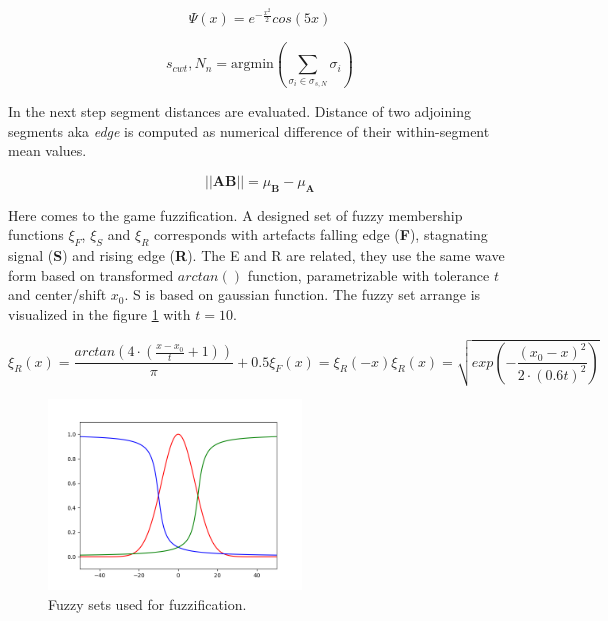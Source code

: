 \begin{equation}
\Psi(x) = e^{-\frac{x^2}{2}} cos(5x)
\label{eq:morlet}
\end{equation}

\begin{equation}
s_{cwt}, N_{n} = \text{argmin} ( \sum_{\sigma_i \in \sigma_{s,N}} \sigma_i )
\label{eq:cwtparamssearch}
\end{equation}

In the next step segment distances are evaluated. Distance of two adjoining segments aka {\it edge} is computed as numerical
difference of their within-segment mean values.

\begin{equation}
||\textbf{AB}|| = \mu_\textbf{B} - \mu_\textbf{A}
\end{equation}

Here comes to the game fuzzification. A designed set of fuzzy membership functions $\xi_F$, $\xi_S$ and $\xi_R$
corresponds with artefacts falling edge (\textbf{F}), stagnating signal (\textbf{S}) and rising edge (\textbf{R}).
The E and R are related, they use the same wave form based on transformed $arctan()$ function, parametrizable with
tolerance $t$ and center/shift $x_0$. S is based on gaussian function. The fuzzy set arrange is visualized
in the figure \ref{fig:fuzzysets} with $t=10$.

\begin{subequations}
\begin{equation}
\xi_R(x) = \frac{ arctan( 4\cdot (\frac{x - x_0}{t} + 1) )}{\pi} + 0.5
\end{equation}
\begin{equation}
\xi_F(x) = \xi_R(-x)
\end{equation}
\begin{equation}
\xi_R(x) = \sqrt{ exp( -\frac{(x_0 - x)^2}{2\cdot (0.6t)^2} ) }
\end{equation}
\end{subequations}


\begin{figure}[h!]
\begin{center}
\includegraphics[width=0.6\textwidth]{render/fuzzysets.png}
\caption{Fuzzy sets used for fuzzification.\label{fig:fuzzysets}}
\end{center}
\end{figure}

